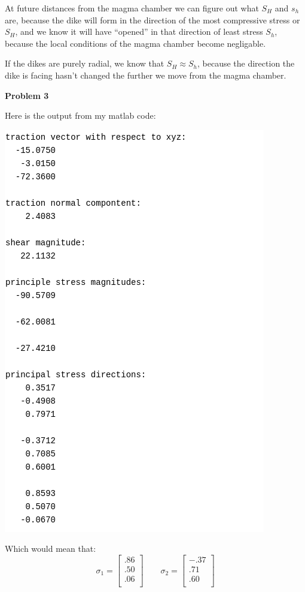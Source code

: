 \documentclass{article}
\begin{document}
At future distances from the magma chamber we can figure out what $S_H$ and $s_h$ are, because the dike will form in the direction of the most compressive stress or $S_H$, and we know it will have ``opened'' in that direction of least stress $S_h$, because the local conditions of the magma chamber become negligable.

If the dikes are purely radial, we know that $S_H \approx S_h$, because the direction the dike is facing hasn't changed the further we move from the magma chamber.

\noindent\textbf{Problem 3}

Here is the output from my matlab code:

\vspace{3mm}

\includegraphics[scale=.5]{output.png}


Which would mean that: $$\sigma_1 =
\begin{bmatrix}
  .86\\
  .50\\
  .06\\
\end{bmatrix}
\qquad
\sigma_2 =
\begin{bmatrix}
  -.37\\
  .71\\
  .60\\
\end{bmatrix}
$$
\end{document}
